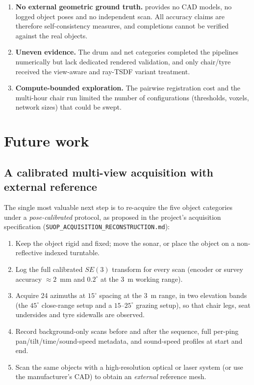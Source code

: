 \begin{enumerate}
  \item \textbf{No external geometric ground truth.} \suop{} provides no CAD
  models, no logged object poses and no independent scan. All \routeA{}
  accuracy claims are therefore self-consistency measures, and \routeB{}
  completions cannot be verified against the real objects.
  \item \textbf{Uneven evidence.} The drum and net categories completed the
  pipelines numerically but lack dedicated rendered validation, and only
  chair/tyre received the view-aware and ray-TSDF variant treatment.
  \item \textbf{Compute-bounded exploration.} The pairwise registration cost
  and the multi-hour chair run limited the number of configurations
  (thresholds, voxels, network sizes) that could be swept.
\end{enumerate}

\section{Future work}
\label{sec:conc_future}

\subsection{A calibrated multi-view acquisition with external reference}
The single most valuable next step is to re-acquire the five \suop{} object
categories under a \emph{pose-calibrated} protocol, as proposed in the
project's acquisition specification (\texttt{SUOP\_ACQUISITION\_RECONSTRUCTION.md}):

\begin{enumerate}
  \item Keep the object rigid and fixed; move the sonar, or place the object
  on a non-reflective indexed turntable.
  \item Log the full calibrated $SE(3)$ transform for every scan (encoder or
  survey accuracy $\approx 2$~mm and $0.2^\circ$ at the 3~m working range).
  \item Acquire 24 azimuths at $15^\circ$ spacing at the 3~m range, in two
  elevation bands (the \suop{} $45^\circ$ close-range setup and a
  $15$--$25^\circ$ grazing setup), so that chair legs, seat undersides and
  tyre sidewalls are observed.
  \item Record background-only scans before and after the sequence, full
  per-ping pan/tilt/time/sound-speed metadata, and sound-speed profiles at
  start and end.
  \item Scan the same objects with a high-resolution optical or laser system
  (or use the manufacturer's CAD) to obtain an \emph{external} reference mesh.
\end{enumerate}

